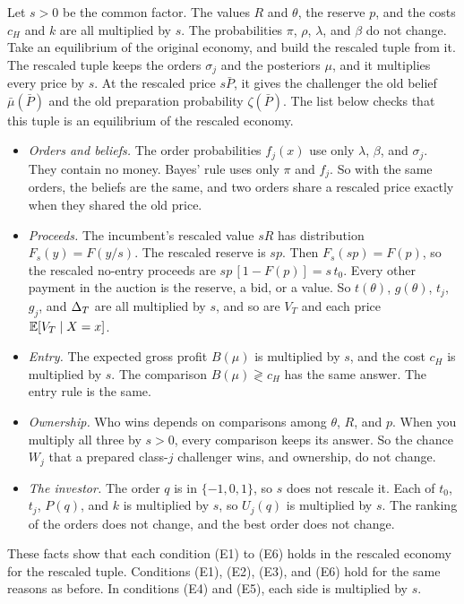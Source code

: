Let \(s>0\) be the common factor.
The values \(R\) and \(\theta\), the reserve \(p\), and the costs \(c_H\) and \(k\) are all multiplied by \(s\).
The probabilities \(\pi\), \(\rho\), \(\lambda\), and \(\beta\) do not change.
Take an equilibrium of the original economy, and build the rescaled tuple from it.
The rescaled tuple keeps the orders \(\sigma_j\) and the posteriors \(\mu\), and it multiplies every price by \(s\).
At the rescaled price \(s\bar P\), it gives the challenger the old belief \(\bar\mu(\bar P)\) and the old preparation probability \(\zeta(\bar P)\).
The list below checks that this tuple is an equilibrium of the rescaled economy.

\begin{itemize}
\item \emph{Orders and beliefs.} The order probabilities \(f_j(x)\) use only \(\lambda\), \(\beta\), and \(\sigma_j\). They contain no money. Bayes' rule uses only \(\pi\) and \(f_j\). So with the same orders, the beliefs are the same, and two orders share a rescaled price exactly when they shared the old price.
\item \emph{Proceeds.} The incumbent's rescaled value \(sR\) has distribution \(F_s(y)=F(y/s)\). The rescaled reserve is \(sp\). Then \(F_s(sp)=F(p)\), so the rescaled no-entry proceeds are \(sp\,[1-F(p)]=s\,t_0\). Every other payment in the auction is the reserve, a bid, or a value. So \(t(\theta)\), \(g(\theta)\), \(t_j\), \(g_j\), and \(\Delta_T\) are all multiplied by \(s\), and so are \(V_T\) and each price \(\mathbb{E}[V_T\mid X=x]\).
\item \emph{Entry.} The expected gross profit \(B(\mu)\) is multiplied by \(s\), and the cost \(c_H\) is multiplied by \(s\). The comparison \(B(\mu)\gtrless c_H\) has the same answer. The entry rule is the same.
\item \emph{Ownership.} Who wins depends on comparisons among \(\theta\), \(R\), and \(p\). When you multiply all three by \(s>0\), every comparison keeps its answer. So the chance \(W_j\) that a prepared class-\(j\) challenger wins, and ownership, do not change.
\item \emph{The investor.} The order \(q\) is in \(\{-1,0,1\}\), so \(s\) does not rescale it. Each of \(t_0\), \(t_j\), \(P(q)\), and \(k\) is multiplied by \(s\), so \(U_j(q)\) is multiplied by \(s\). The ranking of the orders does not change, and the best order does not change.
\end{itemize}

These facts show that each condition (E1) to (E6) holds in the rescaled economy for the rescaled tuple.
Conditions (E1), (E2), (E3), and (E6) hold for the same reasons as before. In conditions (E4) and (E5), each side is multiplied by \(s\).


